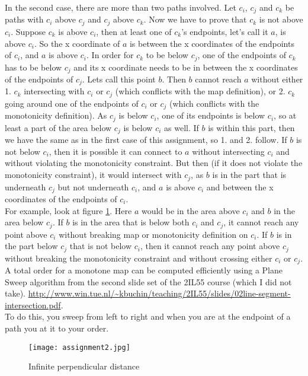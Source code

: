 \documentclass[a4paper,11pt]{article}
\begin{document}
In the second case, there are more than two paths involved. Let $c_i$, $c_j$ and $c_k$ be paths with $c_i$ above $c_j$ and $c_j$ above $c_k$. Now we have to prove that $c_k$ is not above $c_i$. Suppose $c_k$ is above $c_i$, then at least one of $c_k$'s endpoints, let's call it $a$, is above $c_i$. So the x coordinate of $a$ is between the x coordinates of the endpoints of $c_i$, and $a$ is above $c_i$. In order for $c_k$ to be below $c_j$, one of the endpoints of $c_k$ has to be below $c_j$ and its x coordinate needs to be in between the x coordinates of the endpoints of $c_j$. Lets call this point $b$. Then $b$ cannot reach $a$ without either 1. $c_k$ intersecting with $c_i$ or $c_j$ (which conflicts with the map definition), or 2. $c_k$ going around one of the endpoints of $c_i$ or $c_j$ (which conflicts with the monotonicity definition). As $c_j$ is below $c_i$, one of its endpoints is below $c_i$, so at least a part of the area below $c_j$ is below $c_i$ as well. If $b$ is within this part, then we have the same as in the first case of this assignment, so 1. and 2. follow. If $b$ is not below $c_i$, then it is possible it can connect to $a$ without intersecting $c_i$ and without violating the monotonicity constraint. But then (if it does not violate the monotonicity constraint), it would intersect with $c_j$, as $b$ is in the part that is underneath $c_j$ but not underneath $c_i$, and $a$ is above $c_i$ and between the x coordinates of the endpoints of $c_i$.\\
For example, look at figure \ref{fig:ass2}. Here $a$ would be in the area above $c_i$ and $b$ in the area below $c_j$. If $b$ is in the area that is below both $c_i$ and $c_j$, it cannot reach any point above $c_i$ without breaking map or monotonicity definition on $c_i$. If $b$ is in the part below $c_j$ that is not below $c_i$, then it cannot reach any point above $c_j$ without breaking the monotonicity constraint and without crossing either $c_i$ or $c_j$.\\

A total order for a monotone map can be computed efficiently using a Plane Sweep algorithm from the second slide set of the 2IL55 course (which I did not take). \url{http://www.win.tue.nl/~kbuchin/teaching/2IL55/slides/02line-segment-intersection.pdf}.\\
To do this, you sweep from left to right and when you are at the endpoint of a path you at it to your order.


\begin{figure}[H]
	\centering
	\texttt{[image: assignment2.jpg]}
	\caption{Infinite perpendicular distance}
	\label{fig:ass2}
\end{figure}
\end{document}
